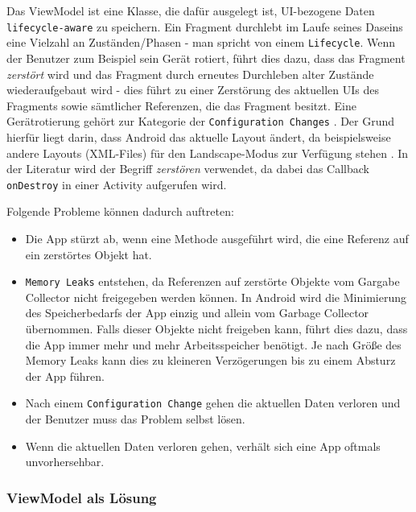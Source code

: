 Das ViewModel ist eine Klasse, die dafür ausgelegt ist, UI-bezogene
Daten \texttt{lifecycle-aware} zu speichern. Ein Fragment durchlebt im
Laufe seines Daseins eine Vielzahl an Zuständen/Phasen - man spricht von
einem \texttt{Lifecycle}. Wenn der Benutzer zum Beispiel sein Gerät
rotiert, führt dies dazu, dass das Fragment \emph{zerstört} wird und das
Fragment durch erneutes Durchleben alter Zustände wiederaufgebaut wird -
dies führt zu einer Zerstörung des aktuellen UIs des Fragments sowie
sämtlicher Referenzen, die das Fragment besitzt. Eine Gerätrotierung
gehört zur Kategorie der \texttt{Configuration\ Changes}
\cite{viewmodel}. Der Grund hierfür liegt darin, dass Android das
aktuelle Layout ändert, da beispielsweise andere Layouts (XML-Files) für
den Landscape-Modus zur Verfügung stehen \cite{configuration-changes}.
In der Literatur wird der Begriff \emph{zerstören} verwendet, da dabei
das Callback \texttt{onDestroy} in einer Activity aufgerufen wird.

Folgende Probleme können dadurch auftreten:

\begin{itemize}
\tightlist
\item
  Die App stürzt ab, wenn eine Methode ausgeführt wird, die eine
  Referenz auf ein zerstörtes Objekt hat.
\item
  \texttt{Memory\ Leaks} entstehen, da Referenzen auf zerstörte Objekte
  vom Gargabe Collector nicht freigegeben werden können. In Android wird
  die Minimierung des Speicherbedarfs der App einzig und allein vom
  Garbage Collector übernommen. Falls dieser Objekte nicht freigeben
  kann, führt dies dazu, dass die App immer mehr und mehr
  Arbeitsspeicher benötigt. Je nach Größe des Memory Leaks kann dies zu
  kleineren Verzögerungen bis zu einem Absturz der App führen.
\item
  Nach einem \texttt{Configuration\ Change} gehen die aktuellen Daten
  verloren und der Benutzer muss das Problem selbst lösen.
\item
  Wenn die aktuellen Daten verloren gehen, verhält sich eine App oftmals
  unvorhersehbar.
\end{itemize}

\hypertarget{viewmodel-als-luxf6sung}{%
\subsubsection{ViewModel als Lösung}\label{viewmodel-als-luxf6sung}}

